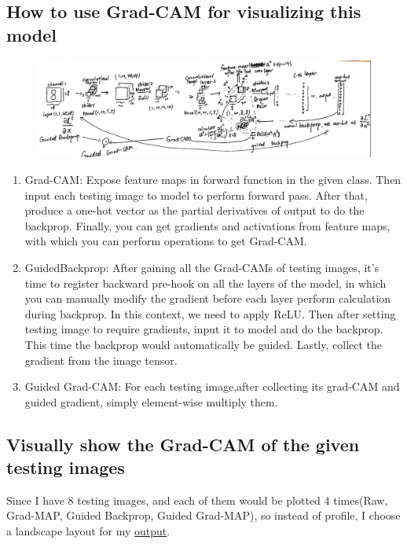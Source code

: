 \documentclass[12pt]{article}
\begin{document}
\subsection{How to use Grad-CAM for visualizing this model}
\begin{figure}[h]
    \centering
    \includegraphics[width=1\linewidth]{../how.jpg}
    \end{figure}
\begin{enumerate}
    \item Grad-CAM: Expose feature maps in forward function in the given class. Then input each testing image to model to perform forward pass. After that, produce a one-hot vector as the partial derivatives of output to do the backprop. Finally, you can get gradients and activations from feature maps, with which you can perform operations to get Grad-CAM.
    \item GuidedBackprop: After gaining all the Grad-CAMs of testing images, it's time to register backward pre-hook on all the layers of the model, in which you can manually modify the gradient before each layer perform calculation during backprop. In this context, we need to apply ReLU. Then after setting testing image to require gradients, input it to model and do the backprop. This time the backprop would automatically be guided. Lastly, collect the gradient from the image tensor.
    \item Guided Grad-CAM: For each testing image,after collecting its grad-CAM and guided gradient, simply element-wise multiply them.
\end{enumerate}

\subsection{Visually show the Grad-CAM of the given testing images}

Since I have 8 testing images, and each of them would be plotted 4 times(Raw, Grad-MAP, Guided Backprop, Guided Grad-MAP), so instead of profile, I choose a landscape layout for my \hyperref[fig:output]{output}.
\end{document}
